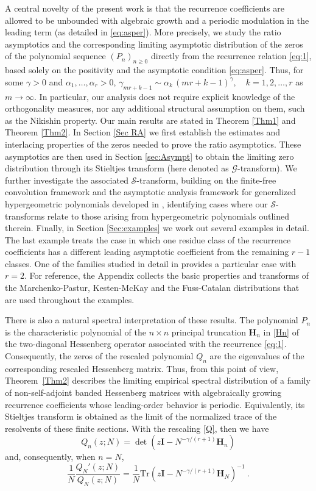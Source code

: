 \documentclass[12pt]{article}
\newcommand{\St}{\mathcal{S}} %
\newcommand{\Gt}{\mathcal{G}} %
\numberwithin{equation}{section}
\begin{document}
A central novelty of the present work is that the recurrence coefficients are allowed to be unbounded with algebraic growth and a periodic modulation in the leading term (as detailed in \eqref{eq:asper}). More precisely, we study the ratio asymptotics and the corresponding limiting asymptotic distribution of the zeros of the polynomial sequence $(P_n)_{n\geq 0}$ directly from the recurrence relation \eqref{eq:1}, based solely on the positivity and the asymptotic condition \eqref{eq:asper}. Thus, for some $\gamma>0$ and $\alpha_1,\ldots,\alpha_r>0$,  $\gamma_{m r + k-1} \sim \alpha_k \, (mr+k-1)^{\gamma},\quad k=1,2,\ldots, r$ as $m\to\infty$. In particular, our analysis does not require explicit knowledge of the orthogonality measures, nor any 
additional structural assumption on them, such as the Nikishin property. Our main results are stated in Theorem \ref{Thm1} and Theorem \ref{Thm2}. In Section \ref{Sec RA} we first establish the estimates and interlacing properties of the zeros needed to prove the ratio asymptotics. These asymptotics are  then used in Section \ref{sec:Asympt} to obtain the limiting zero distribution through its Stieltjes transform (here denoted as \(\Gt\)-transform). We further investigate the associated \(\St\)-transform, building on the finite-free convolution framework \cite{MF-M-P1} and the asymptotic analysis framework for generalized hypergeometric polynomials developed in \cite{MF-MP2}, identifying cases where our \(\St\)-transforms relate to those arising from hypergeometric polynomials outlined therein. Finally, in Section \ref{Sec:examples} we work out several examples in detail. The last example treats the case in which one residue class of the recurrence coefficients has a different leading asymptotic coefficient from the remaining $r-1$ classes. One of the families studied in detail in \cite[Case B]{AnaWVA} provides a particular case with $r=2$. For reference, the
Appendix collects the basic properties and transforms of the Marchenko-Pastur, Kesten-McKay and the Fuss-Catalan distributions that are used throughout the examples. 

There is also a natural spectral interpretation of these results. The polynomial \(P_n\) is the characteristic polynomial of the \(n\times n\) principal truncation \(\mathbf{H}_n\) in \eqref{Hn} of the two-diagonal Hessenberg operator associated with the recurrence \eqref{eq:1}. Consequently, the zeros of the rescaled polynomial \(Q_n\) are the eigenvalues of the corresponding rescaled Hessenberg matrix. Thus, from this point of view, Theorem~\ref{Thm2} describes the limiting empirical spectral distribution of a family of non-self-adjoint banded Hessenberg matrices with algebraically growing recurrence coefficients whose leading-order behavior is periodic. Equivalently, its Stieltjes transform is obtained as the limit of the normalized trace of the resolvents of these finite sections. 
With the rescaling \eqref{Q}, then we have 
\[
	Q_{n}(z;N) = \det \left(z \mathbf{I} - N^{-\gamma/(r+1)} \mathbf{H}_n\right)
\]
and, consequently, when $n=N$, 
\[ \frac{1}{N} \frac{Q_N'(z;N)}{Q_N(z;N)} = \frac{1}{N} \mathrm{Tr} \left(z \mathbf{I} - N^{-\gamma/(r+1)} \mathbf{H}_N\right)^{-1}\ .\]
\end{document}
